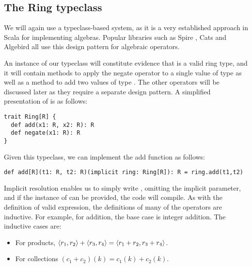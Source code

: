 \subsection{The Ring typeclass}

We will again use a typeclass-based system, as it is a very established approach in Scala for implementing algebras. Popular libraries such as Spire \cite{spire}, Cats \cite{cats} and Algebird \cite{algebird} all use this design pattern for algebraic operators.

An instance of our typeclass  will constitute evidence that  is a valid ring type, and it will contain methods to apply the negate operator to a single value of type  as well as a method to add two values of type . The other operators will be discussed later as they require a separate design pattern. A simplified presentation of  is as follows:
\vs
\begin{lstlisting}
trait Ring[R] {
  def add(x1: R, x2: R): R
  def negate(x1: R): R
}
\end{lstlisting}\vs
Given this typeclass, we can implement the add function as follows:
\vs\begin{lstlisting}
def add[R](t1: R, t2: R)(implicit ring: Ring[R]): R = ring.add(t1,t2)
\end{lstlisting}\vs
Implicit resolution enables us to simply write , omitting the implicit parameter, and if the instance of  can be provided, the code will compile. As with the definition of valid expression, the definitions of many of the operators are inductive. For example, for addition, the base case is integer addition. The inductive cases are:
\begin{itemize}
\item{For products, $\langle r_1, r_2 \rangle + \langle r_3, r_4 \rangle = \langle r_1 + r_2, r_3 + r_4 \rangle$.}
\item{For collections $(c_1 + c_2)(k) = c_1(k) + c_2(k)$.}
\end{itemize}

